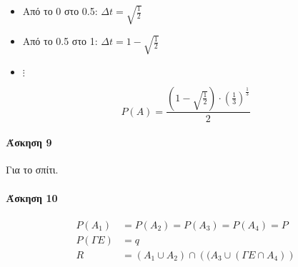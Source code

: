 \documentclass[11pt,a4paper,titlepage,draft]{article}
\begin{document}
\begin{itemize}
\item Από το 0 στο 0.5: \(\Delta t = \sqrt{\frac{1}{2}} \)
\item Από το 0.5 στο 1: \(\Delta t = 1-\sqrt{\frac{1}{2}} \)
\item \(\vdots\)
\end{itemize}

\[ 
P(A)=\frac{(1-\sqrt{\frac{1}{2}})\cdot\left( \frac{1}{3} \right)^\frac{1}{3}}{2}
\]

\paragraph{Άσκηση 9}
Για το σπίτι.

\paragraph{Άσκηση 10}

\begin{align*}
P(A_1)&=P(A_2)=P(A_3)=P(A_4)=P \\
P( \Gamma E) &= q \\
R &= (A_1 \cup A_2) \cap \left( (A_3 \cup (  \Gamma E \cap A_4)  \right)
\end{align*}
\end{document}
